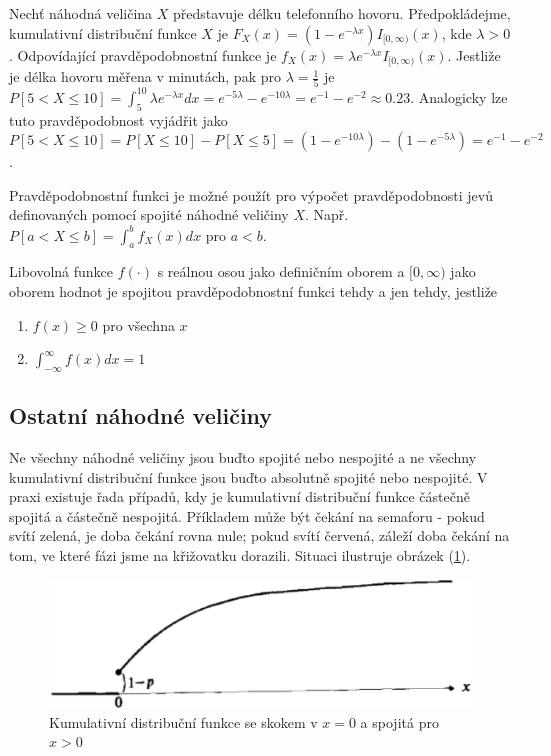 \begin{example}
Nechť náhodná veličina $X$ představuje délku telefonního hovoru. Předpokládejme, kumulativní distribuční funkce $X$ je $F_X(x) = (1 - e^{-\lambda x})I_{[0, \infty)}(x)$, kde $\lambda > 0$. Odpovídající pravděpodobnostní funkce je $f_X(x) = \lambda e^{-\lambda x}I_{[0, \infty)}(x)$. Jestliže je délka hovoru měřena v minutách, pak pro $\lambda = \frac{1}{5}$ je $P[5 < X \le 10] = \int_5^{10} \lambda e^{-\lambda x}dx = e^{-5 \lambda} - e^{-10 \lambda} = e^{-1} - e^{-2} \approx 0.23$. Analogicky lze tuto pravděpodobnost vyjádřit jako $P[5 < X \le 10] = P[X \le 10] - P[X \le 5] = (1 - e^{-10 \lambda}) - (1 - e^{-5 \lambda}) = e^{-1}- e^{-2}$.
\end{example}

Pravděpodobnostní funkci je možné použít pro výpočet pravděpodobnosti jevů definovaných pomocí spojité náhodné veličiny $X$. Např. $P[a < X \le b] = \int_a^b f_X(x)dx$ pro $a < b$.

\begin{definition}
Libovolná funkce $f(\cdot)$ s reálnou osou jako definičním oborem a $[0, \infty)$ jako oborem hodnot je spojitou pravděpodobnostní funkci tehdy a jen tehdy, jestliže
\begin{enumerate}
\item $f(x) \ge 0$ pro všechna $x$
\item $\int_{-\infty}^{\infty}f(x)dx = 1$
\end{enumerate}
\end{definition}

\subsection{Ostatní náhodné veličiny}

Ne všechny náhodné veličiny jsou buďto spojité nebo nespojité a ne všechny kumulativní distribuční funkce jsou buďto absolutně spojité nebo nespojité. V praxi existuje řada případů, kdy je kumulativní distribuční funkce částečně spojitá a částečně nespojitá. Příkladem může být čekání na semaforu - pokud svítí zelená, je doba čekání rovna nule; pokud svítí červená, záleží doba čekání na tom, ve které fázi jsme na křižovatku dorazili. Situaci ilustruje obrázek (\ref{cross-road}).

\begin{figure}[htp]
\centering
\includegraphics[scale = 0.5]{pictures/partially_continuous_and_discrete.eps}
\caption{Kumulativní distribuční funkce se skokem v $x = 0$ a spojitá pro $x > 0$}
\label{cross-road}
\end{figure}

